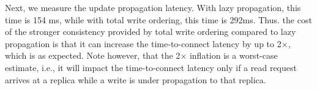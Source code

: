 Next, we measure the update propagation latency. With lazy propagation, this time is 154 ms, while with total write ordering, this time is 292ms. Thus. the cost of the stronger consistency provided by total write ordering compared to lazy propagation is that it can increase the time-to-connect latency by up to 2$\times$, which is as expected. Note however, that the 2$\times$ inflation is a worst-case estimate, i.e., it will impact the time-to-connect latency only if a read request arrives at a replica while a write is under propagation to that replica.



%
%
%





